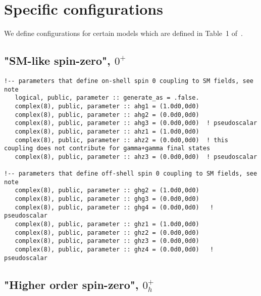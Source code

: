 \documentclass[aps,superscriptaddress,nofootinbib]{revtex4}
\begin{document}
\clearpage
\appendix


\section{Specific configurations}

We define configurations for certain models which are defined in Table~1 of~\cite{Bolognesi:2012}.

\subsection{"SM-like spin-zero", $0^+$}

\footnotesize
\begin{verbatim}
!-- parameters that define on-shell spin 0 coupling to SM fields, see note
   logical, public, parameter :: generate_as = .false.
   complex(8), public, parameter :: ahg1 = (1.0d0,0d0)
   complex(8), public, parameter :: ahg2 = (0.0d0,0d0)
   complex(8), public, parameter :: ahg3 = (0.0d0,0d0)  ! pseudoscalar
   complex(8), public, parameter :: ahz1 = (1.0d0,0d0)
   complex(8), public, parameter :: ahz2 = (0.0d0,0d0)  ! this coupling does not contribute for gamma+gamma final states
   complex(8), public, parameter :: ahz3 = (0.0d0,0d0)  ! pseudoscalar

!-- parameters that define off-shell spin 0 coupling to SM fields, see note
   complex(8), public, parameter :: ghg2 = (1.0d0,0d0)
   complex(8), public, parameter :: ghg3 = (0.0d0,0d0)
   complex(8), public, parameter :: ghg4 = (0.0d0,0d0)   ! pseudoscalar
   complex(8), public, parameter :: ghz1 = (1.0d0,0d0)
   complex(8), public, parameter :: ghz2 = (0.0d0,0d0)
   complex(8), public, parameter :: ghz3 = (0.0d0,0d0)
   complex(8), public, parameter :: ghz4 = (0.0d0,0d0)   ! pseudoscalar 
\end{verbatim}
\normalsize

\subsection{"Higher order spin-zero", $0_h^+$}
\end{document}
